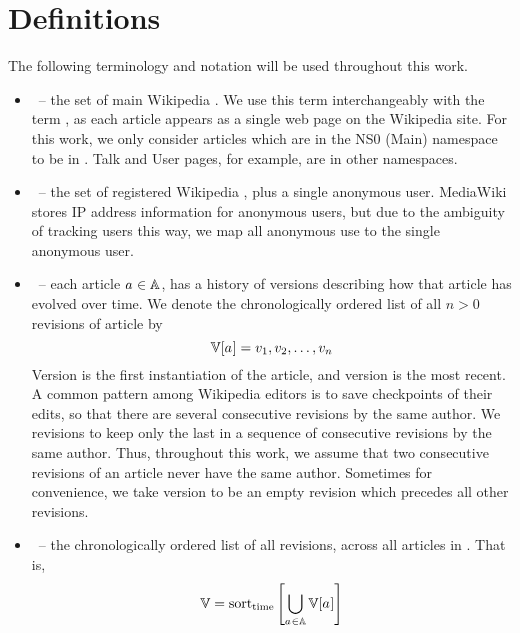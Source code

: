 
\chapter{Definitions}
\label{ch:defs}

The following terminology and notation
will be used throughout this work.

\renewcommand{\labelitemi}{}
\begin{itemize}
\item \articles \ -- the set of main Wikipedia .
    We use this term interchangeably with the term ,
    as each article appears as a single web page on the Wikipedia site.
    For this work, we only consider articles which are in
    the NS0 (Main) namespace to be in \articles.
    Talk and User pages, for example, are in other namespaces.
\item \users \ -- the set of registered Wikipedia ,
    plus a single anonymous user.
    MediaWiki stores IP address information for anonymous users,
    but due to the ambiguity of tracking users this way,
    we map all anonymous use to the single anonymous user.
\item \versions{\article{}} \ -- each article $a_{} \in \mathbb{A}$,
    has a history of versions
    describing how that article has evolved over time.
    We denote the chronologically ordered list
    of all $n > 0$ revisions of article \article{} by
    \begin{equation}
	\versions{\article{}} =
		\version{1}, \version{2}, \ldots, \version{n}
    \end{equation}
    Version  is the first instantiation of the article,
    and version  is the most recent.
    A common pattern among Wikipedia editors is to save checkpoints
    of their edits, so that there are several consecutive revisions by
    the same author.
    We  revisions to keep only the last in a sequence of
    consecutive revisions by the same author.
    Thus, throughout this work, we assume that two consecutive revisions
    of an article never have the same author.
    Sometimes for convenience, we take version  to be
    an empty revision which precedes all other revisions.
\item \versions{} \ -- the chronologically ordered list of all
    revisions, across all articles in \articles.
    That is,
    \begin{equation}
    \versions{} = \mathrm{sort}_\mathrm{time}\left[
	\bigcup_{\article{} \in \articles} \versions{\article{}}
	\right]
    \end{equation}


\end{itemize}
